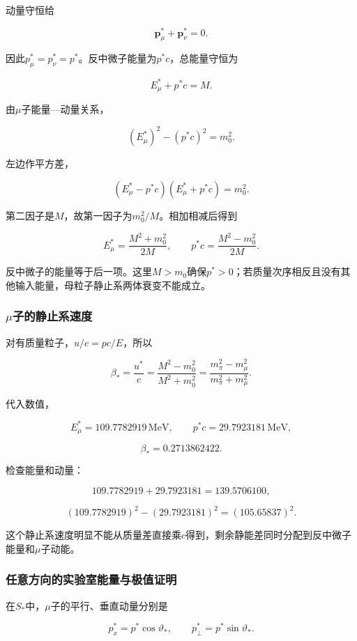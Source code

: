 \documentclass[12pt,a4paper,fontset=fandol]{ctexart}
\begin{document}
动量守恒给

\[
\boldsymbol p_\mu^*+\boldsymbol p_\nu^*=0.
\]

因此\(p_\mu^*=p_\nu^*=p^*\)。反中微子能量为\(p^*c\)，总能量守恒为

\[
E_\mu^*+p^*c=M.
\]

由\(\mu\)子能量---动量关系，

\[
(E_\mu^*)^2-(p^*c)^2=m_0^2.
\]

左边作平方差，

\[
(E_\mu^*-p^*c)(E_\mu^*+p^*c)=m_0^2.
\]

第二因子是\(M\)，故第一因子为\(m_0^2/M\)。相加相减后得到

\[
\boxed{E_\mu^*=\frac{M^2+m_0^2}{2M}},
\qquad
\boxed{p^*c=\frac{M^2-m_0^2}{2M}}.
\]

反中微子的能量等于后一项。这里\(M>m_0\)确保\(p^*>0\)；若质量次序相反且没有其他输入能量，母粒子静止系两体衰变不能成立。

\subsubsection{\texorpdfstring{\(\mu\)子的静止系速度}{\textbackslash mu子的静止系速度}}\label{muux5b50ux7684ux9759ux6b62ux7cfbux901fux5ea6}

对有质量粒子，\(u/c=pc/E\)，所以

\[
\boxed{
\beta_*=\frac{u^*}{c}
=\frac{M^2-m_0^2}{M^2+m_0^2}
=\frac{m_\pi^2-m_\mu^2}{m_\pi^2+m_\mu^2}}.
\]

代入数值，

\[
E_\mu^*=109.7782919\,\mathrm{MeV},
\qquad
p^*c=29.7923181\,\mathrm{MeV},
\]

\[
\boxed{\beta_*=0.2713862422}.
\]

检查能量和动量：

\[
109.7782919+29.7923181=139.5706100,
\]

\[
(109.7782919)^2-(29.7923181)^2
=(105.65837)^2.
\]

这个静止系速度明显不能从质量差直接乘\(c\)得到，剩余静能差同时分配到反中微子能量和\(\mu\)子动能。

\subsubsection{任意方向的实验室能量与极值证明}\label{ux4efbux610fux65b9ux5411ux7684ux5b9eux9a8cux5ba4ux80fdux91cfux4e0eux6781ux503cux8bc1ux660e}

在\(S_*\)中，\(\mu\)子的平行、垂直动量分别是

\[
p_x^*=p^*\cos\vartheta_*,
\qquad
p_\perp^*=p^*\sin\vartheta_*.
\]
\end{document}
